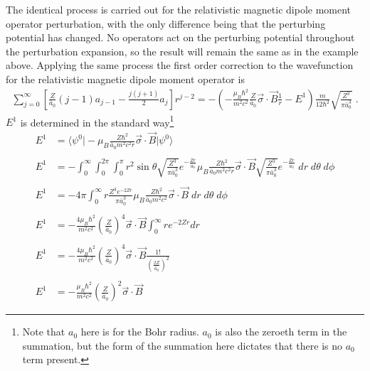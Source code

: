     The identical process is carried out for the relativistic magnetic dipole moment operator perturbation, with the only difference being that the perturbing potential has changed. No operators act on the perturbing potential throughout the perturbation expansion, so the result will remain the same as in the example above. Applying the same process the first order correction to the wavefunction for the relativistic magnetic dipole moment operator is 
    \begin{align}
        \sum_{j = 0}^\infty \left[ \frac{Z}{\bar{a}_0}(j-1)a_{j-1} - \frac{j(j+1)}{2} a_j \right] r^{j-2} = -\left(- \frac{\mu_B \hbar^2}{m^2c^2} \frac{Z}{\bar{a}_0} \vec{\sigma} \cdot \vec{B} \frac{1}{r} - E^1 \right) \frac{m}{12 \hbar^2}\sqrt{\frac{Z^3}{\pi \bar{a}_0^3}}\;.
    \end{align}
    \noindent $E^1$ is determined in the standard way\footnote{Note that $a_0$ here is for the Bohr radius. $a_0$ is also the zeroeth term in the summation, but the form of the summation here dictates that there is no $a_0$ term present.}
    \begin{align*}
        E^1 &= \langle \psi^0 \vert - \mu_B \frac{Z \hbar^2}{\bar{a}_0 m^2 c^2 r} \vec{\sigma} \cdot \vec{B} \vert \psi^0 \rangle \\ \nonumber \\
        E^1 &= -\int_0^\infty \int_0^{2\pi} \int_0^\pi r^2 \sin \theta \sqrt{\frac{Z^3}{\pi \bar{a}_0^3}} e^{-\frac{Zr}{\bar{a}_0}} \mu_B \frac{Z \hbar^2}{\bar{a}_0 m^2 c^2 r} \vec{\sigma} \cdot \vec{B} \sqrt{\frac{Z^3}{\pi \bar{a}_0^3}} e^{-\frac{Zr}{\bar{a}_0}}\;dr\;d\theta\;d\phi  \\\nonumber \\
        E^1 &= -4\pi \int_0^\infty r \frac{Z^3 e^{-2Zr}}{\pi \bar{a}_0^3} \mu_B \frac{Z \hbar^2}{\bar{a}_0 m^2 c^2} \vec{\sigma} \cdot \vec{B} \;dr\;d\theta\;d\phi\\\nonumber\\
        E^1 &= - \frac{4 \mu_B \hbar^2}{m^2 c^2} \left(\frac{Z}{\bar{a}_0} \right)^4\vec{\sigma} \cdot \vec{B} \int_0^\infty r e^{-2Zr} dr \\\nonumber \\
        E^1 &= - \frac{4 \mu_B \hbar^2}{m^2 c^2} \left(\frac{Z}{\bar{a}_0} \right)^4\vec{\sigma} \cdot \vec{B} \frac{1!}{(\frac{2Z}{\bar{a}_0})^2} \\\nonumber \\
        E^1 &= - \frac{\mu_B \hbar^2}{m^2 c^2} \left(\frac{Z}{\bar{a}_0} \right)^2\vec{\sigma} \cdot \vec{B}
    \end{align*}
